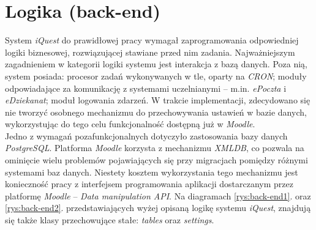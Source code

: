 \section{Logika (back-end)}
\label{Chapter66}

System \textit{iQuest} do prawidłowej pracy wymagał zaprogramowania odpowiedniej logiki biznesowej, rozwiązującej stawiane przed nim zadania. Najważniejszym zagadnieniem w kategorii logiki systemu jest interakcja z bazą danych. Poza nią, system posiada: procesor zadań wykonywanych w tle, oparty na \textit{CRON}; moduły odpowiadające za komunikację z systemami uczelnianymi -- m.in. \textit{ePoczta} i \textit{eDziekanat}; moduł logowania zdarzeń. W trakcie implementacji, zdecydowano się nie tworzyć osobnego mechanizmu do przechowywania ustawień w bazie danych, wykorzystując do tego celu funkcjonalność dostępną już w \textit{Moodle}. \\

Jedno z wymagań pozafunkcjonalnych dotyczyło zastosowania bazy danych \textit{PostgreSQL}. Platforma \textit{Moodle} korzysta z mechanizmu \emph{XMLDB}, co pozwala na ominięcie wielu problemów pojawiających się przy migracjach pomiędzy różnymi systemami baz danych. Niestety kosztem wykorzystania tego mechanizmu jest konieczność pracy z interfejsem programowania aplikacji dostarczanym przez platformę \textit{Moodle} -- \textit{Data manipulation API}. Na diagramach \ref{rys:back-end1}. oraz \ref{rys:back-end2}. przedstawiających wyżej opisaną logikę systemu \textit{iQuest}, znajdują się także klasy przechowujące stałe: \textit{tables} oraz \textit{settings}. \\

